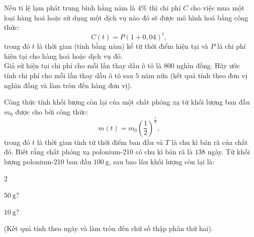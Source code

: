 \begin{bt}%

	Nếu tỉ lệ lạm phát trung bình hằng năm là $4 \%$ thì chi phí $C$ cho việc mua một loại hàng hoá hoặc sử dụng một dịch vụ nào đó sẽ được mô hình hoá bằng công thức:
	$$C(t)=P(1+0{,}04)^t,$$
	trong đó $t$ là thời gian (tính bằng năm) kể từ thời điểm hiện tại và $P$ là chi phí hiện tại cho hàng hoá hoặc dịch vụ đó.\\
	Giả sử hiện tại chi phí cho mỗi lần thay dầu ô tô là $ 800 $ nghìn đồng. Hãy ước tính chi phí cho mỗi lần thay dầu ô tô sau $ 5 $ năm nữa (kết quả tính theo đơn vị nghìn đồng và làm tròn đến hàng đơn vị).
\end{bt}

\begin{bt}%

	Công thức tính khối lượng còn lại của một chất phóng xạ từ khối lượng ban đầu $m_0$ được cho bởi công thức:
	$$m(t)=m_0\left(\dfrac{1}{2}\right)^{\tfrac{t}{T}},$$
	trong đó $t$ là thời gian tính từ thời điểm ban đầu và $T$ là chu kì bán rã của chất đó. Biết rằng chất phóng xạ polonium-210 có chu kì bán rã là $ 138 $ ngày. Từ khối lượng polonium-210 ban đầu $100 \mathrm{~g}$, sau bao lâu khối lượng còn lại là:
	\begin{enumEX}{2}
		\item $50 \mathrm{~g}$?
		\item $10 \mathrm{~g}$?
	\end{enumEX}
	(Kết quả tính theo ngày và làm tròn đến chữ số thập phân thứ hai).
\end{bt}

